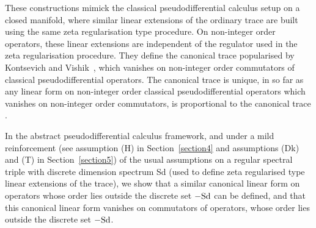 \documentclass[pdftex]{sigma}
\numberwithin{equation}{section}
\begin{document}
These constructions mimick the classical pseudodif\/ferential calculus setup on
a closed manifold, where  similar linear extensions
of the ordinary trace are built using the same zeta regularisation type procedure. On non-integer order operators, these linear extensions are independent of
the regulator  used in the zeta regularisation procedure. They def\/ine  the canonical
trace popu\-larised by Kontsevich and Vishik~\cite{KV},  which  vanishes
on non-integer order commutators of classical pseudodif\/ferential operators. The
canonical trace is unique, in so far as any linear form on  non-integer order
classical pseudodif\/ferential operators  which  vanishes
on non-integer order commutators, is proportional to the canonical trace \cite{MSS}.

In the abstract pseudodif\/ferential calculus framework, and  under a mild
reinforcement (see assumption (H) in Section~\ref{section4}  and assumptions (Dk) and (T) in Section~\ref{section5})  of the usual assumptions on a regular
spectral triple with discrete dimension spectrum Sd (used  to def\/ine zeta regularised type linear extensions of
the trace), we show that  a similar canonical linear form on operators whose
order lies outside the discrete set $-{\rm Sd}$  can be
def\/ined, and that this canonical linear form
vanishes on commutators of operators, whose order lies outside the discrete set
$-{\rm Sd}$.
\end{document}
